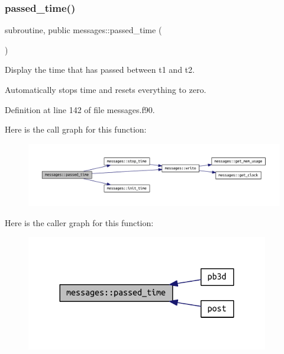 \subsubsection{\texorpdfstring{passed\+\_\+time()}{passed\_time()}}
{\footnotesize\ttfamily subroutine, public messages\+::passed\+\_\+time (\begin{DoxyParamCaption}{ }\end{DoxyParamCaption})}



Display the time that has passed between {\ttfamily t1} and {\ttfamily t2}. 

Automatically stops time and resets everything to zero. 

Definition at line 142 of file messages.\+f90.

Here is the call graph for this function\+:\nopagebreak
\begin{figure}[H]
\begin{center}
\leavevmode
\includegraphics[width=350pt]{namespacemessages_a34da9df28502ccd63e62674d51fe8de8_cgraph}
\end{center}
\end{figure}
Here is the caller graph for this function\+:\nopagebreak
\begin{figure}[H]
\begin{center}
\leavevmode
\includegraphics[width=300pt]{namespacemessages_a34da9df28502ccd63e62674d51fe8de8_icgraph}
\end{center}
\end{figure}
\mbox{\label{namespacemessages_a5686118397930f505259225f3688216b}} 
